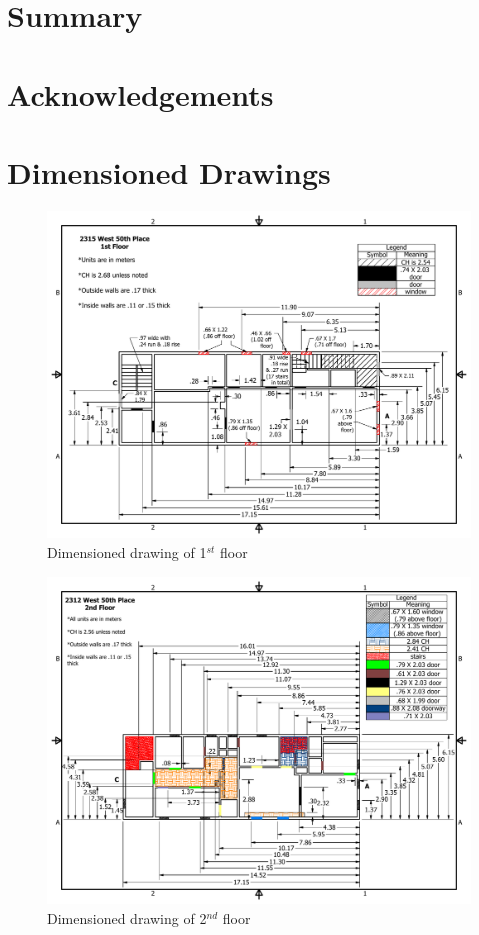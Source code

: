 \documentclass[11pt,oneside]{book}
\begin{document}
\chapter{Summary}

\chapter{Acknowledgements}



\appendix

\chapter{Dimensioned Drawings}

\begin{figure}[h!]
\centering
\includegraphics[width=.80\textwidth]{../Figures/50th_Place_1st_Floor}
\caption {Dimensioned drawing of 1$^{st}$ floor}
\label{fig:first_floor}
\end{figure}

\begin{figure}[h!]
\centering
\includegraphics[width=.80\textwidth]{../Figures/50th_Place_2nd_Floor}
\caption {Dimensioned drawing of 2$^{nd}$ floor}
\label{fig:second_floor}
\end{figure}
\end{document}
